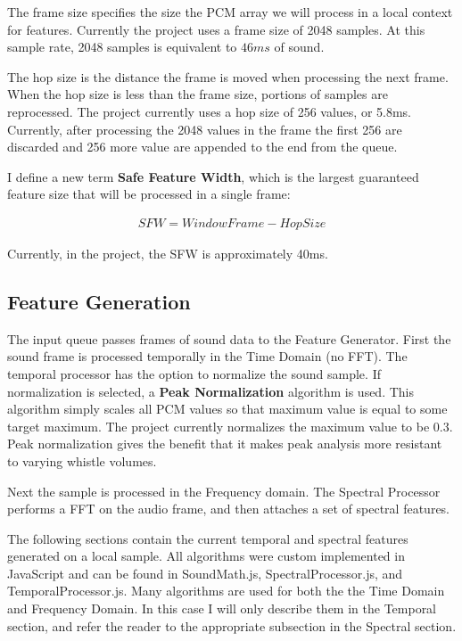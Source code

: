 \documentclass[DIV=calc, paper=a4, fontsize=11pt, twocolumn]{scrartcl}   %
\begin{document}
The frame size specifies the size the PCM array we will process in a local context for features. Currently the project uses a frame size of 2048 samples. At this sample rate, 2048 samples is equivalent to $46ms$ of sound.
\par The hop size is the distance the frame is moved when processing the next frame. When the hop size is less than the frame size, portions of samples are reprocessed. The project currently uses a hop size of 256 values, or 5.8ms. Currently, after processing the 2048 values in the frame the first 256 are discarded and 256 more value are appended to the end from the queue. \par I define a new term \textbf{Safe Feature Width}, which is the largest guaranteed feature size that will be processed in a single frame:

\begin{align}
   SFW = WindowFrame - HopSize
\end{align}

Currently, in the project, the SFW is approximately 40ms.

\subsection{Feature Generation}


The input queue passes frames of sound data to the Feature Generator. First the sound frame is processed temporally in the Time Domain (no FFT). The temporal processor has the option to normalize the sound sample. If normalization is selected, a \textbf{Peak Normalization} algorithm is used. This algorithm simply scales all PCM values so that maximum value is equal to some target maximum. The project currently normalizes the maximum value to be $0.3$. Peak normalization gives the benefit that it makes peak analysis more resistant to varying whistle volumes.
\par Next the sample is processed in the Frequency domain. The Spectral Processor performs a FFT on the audio frame, and then attaches a set of spectral features.

\par The following sections contain the current temporal and spectral features generated on a local sample. All algorithms were custom implemented in JavaScript and can be found in SoundMath.js, SpectralProcessor.js, and TemporalProcessor.js. Many algorithms are used for both the the Time Domain and Frequency Domain. In this case I will only describe them in the Temporal section, and refer the reader to the appropriate subsection in the Spectral section.
\end{document}
